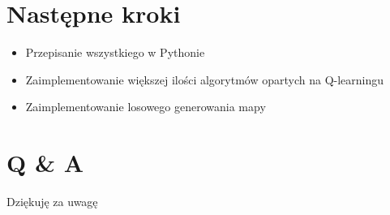 \documentclass[aspectratio=169,15pt,]{beamer}
\begin{document}
\section{Następne kroki}
\begin{frame}
	\sectionpage
\end{frame}

\begin{frame}
\begin{itemize}
 \item<1-> \large{Przepisanie wszystkiego w Pythonie}
 \item<2->\large{Zaimplementowanie większej ilości algorytmów opartych na Q-learningu}
 \item<3-> \large{Zaimplementowanie losowego generowania mapy}
 \end{itemize}
\end{frame}

\section{Q \& A}
\begin{frame}
	\sectionpage

\end{frame}

\begin{frame}
\begin{center}
	\Huge{Dziękuję za uwagę}

\end{center}

\end{frame}
\end{document}
